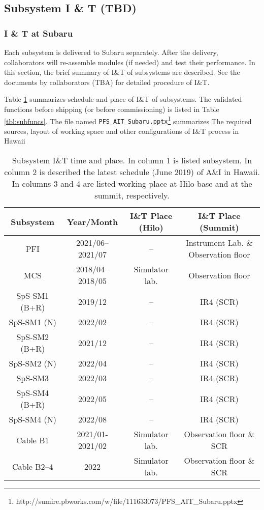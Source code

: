 \subsection{Subsystem I \& T (TBD)}
\subsubsection{I \& T at Subaru}
Each subsystem is delivered to Subaru separately.
After the delivery, collaborators will re-assemble modules (if needed) and test their performance.
In this section, the brief summary of I\&T of subsystems are described.
See the documents by collaborators (TBA) for detailed procedure of I\&T.

Table \ref{tbl:SubSysIandT} summarizes schedule and place of I\&T of subsystems.
The validated functions before shipping (or before commissioning) is listed in Table \ref{tbl:subfuncs}.
The file named {\tt PFS\_AIT\_Subaru.pptx}\footnote{http://sumire.pbworks.com/w/file/111633073/PFS\_AIT\_Subaru.pptx} summarizes The required sources, layout of working space and other configurations of I\&T process in Hawaii

\begin{table}[!ht]
\begin{center}
\caption{Subsystem I\&T time and place.
In column 1 is listed subsystem.
In column 2 is described the latest schedule (June 2019) of A\&I in Hawaii.
In columns 3 and 4 are listed working place at Hilo base and at the summit, respectively.
}
\label{tbl:SubSysIandT} 
\begin{tabular}{*{4}{c}} \hline
Subsystem	& Year/Month & I\&T Place (Hilo) & I\&T Place (Summit) \\ \hline \hline
PFI	& 2021/06--2021/07		& --	& Instrument Lab. \& Observation floor \\
MCS	& 2018/04--2018/05	& Simulator lab.	& Observation floor \\
SpS-SM1 (B+R)	& 2019/12		& -- 	& IR4 (SCR) \\
SpS-SM1 (N)	& 2022/02		& -- 	& IR4 (SCR) \\
SpS-SM2 (B+R)	& 2021/12		& --	 	& IR4 (SCR) \\
SpS-SM2 (N)	& 2022/04		& -- 	& IR4 (SCR) \\
SpS-SM3	& 2022/03		& -- 	& IR4 (SCR) \\
SpS-SM4 (B+R)	&  2022/05		& -- 	& IR4 (SCR) \\
SpS-SM4 (N)	& 2022/08		& -- 	& IR4 (SCR) \\
Cable B1	&	2021/01-2021/02	& Simulator lab.	& Observation floor \& SCR \\
Cable B2--4	&	2022	& Simulator lab.	& Observation floor \& SCR \\ \hline
\end{tabular} 
\end{center}
\end{table}

